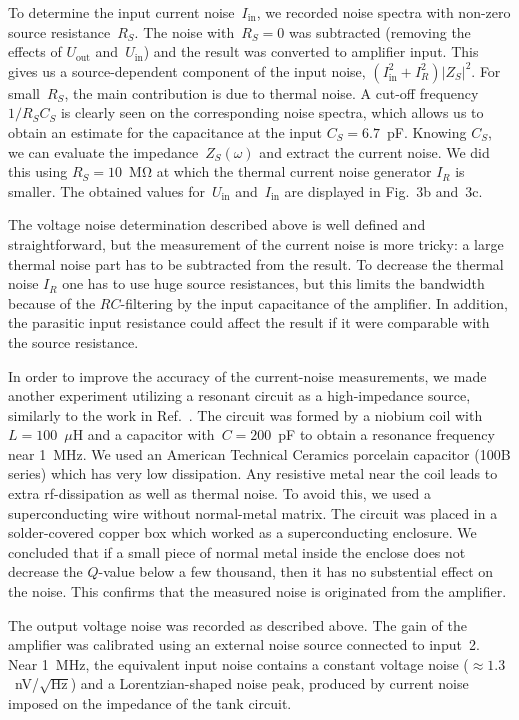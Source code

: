 \documentclass{twocol}
\begin{document}
To determine the input current noise~$I_{\mbox{in}}$, we recorded noise
spectra with non-zero source resistance~$R_S$. The noise with~$R_S=0$ was
subtracted (removing the effects of $U_{\mbox{out}}$ and~$U_{\mbox{in}}$) and
the result was converted to amplifier input. This gives us a source-dependent
component of the input noise, $(I_{\mbox{in}}^2 + I_R^2) |Z_S|^2$. For
small~$R_S$, the main contribution is due to thermal noise. A cut-off frequency $1/R_S
C_S$ is clearly seen on the corresponding noise spectra, which allows us
to obtain an estimate for the capacitance at the input $C_S=6.7$~pF. Knowing $C_S$, we can evaluate the impedance~$Z_S(\omega)$ and
extract the current noise. We did this using $R_S=10$~M$\mathrm{\Omega}$ at which
the thermal current noise generator $I_R$ is smaller. The obtained values for~$U_{\mbox{in}}$
and~$I_{\mbox{in}}$ are displayed in Fig.~3b and~3c.

The voltage noise determination described above is well defined and
straightforward, but the measurement of the current noise is more tricky:
a large thermal  noise part has to be subtracted from the result.
To decrease the thermal noise $I_R$ one has to use huge source resistances,
but this limits the bandwidth because of the $RC$-filtering by the input
capacitance of the amplifier. In addition, the parasitic input resistance could
affect the result if it were comparable with the source resistance.

In order to improve the accuracy of the current-noise measurements, we
made another experiment utilizing a resonant circuit as a high-impedance
source, similarly to the work in Ref.~\cite{2000_koivuniemi}. The circuit
was formed by a niobium coil with $L=100$~$\mu$H and a capacitor
with~$C=200$~pF to obtain a resonance frequency near 1~MHz. We used an
American Technical Ceramics porcelain capacitor (100B series) which has
very low dissipation. Any resistive metal near the coil leads to extra
rf-dissipation as well as thermal noise. To avoid this, we used a
superconducting wire without normal-metal matrix. The circuit was placed
in a solder-covered copper box which worked as a superconducting
enclosure. We concluded that if a small piece of normal metal inside the
enclose does not decrease the $Q$-value below a few thousand, then it has
no substential effect on the noise.  This confirms that the measured
noise is originated from the amplifier.

The output voltage noise was recorded as described above. The gain of the amplifier was
calibrated using an external noise source connected to input~2. Near
1~MHz, the equivalent input noise contains a constant voltage noise
($\approx1.3$~nV/$\sqrt{\mbox{Hz}}$) and a Lorentzian-shaped noise peak,
produced by current noise imposed on the impedance of the tank circuit.
\end{document}
